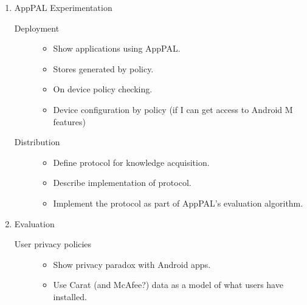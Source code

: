\documentclass[a4paper]{scrartcl}
\begin{document}
\begin{enumerate}
  \item AppPAL Experimentation
    \begin{description}
      \item[Deployment]
        \hfill
        \begin{itemize}
          \item Show applications using AppPAL.
          \item Stores generated by policy.
          \item On device policy checking.
          \item Device configuration by policy (if I can get access to Android M features)
        \end{itemize}
      \item[Distribution]
        \hfill
        \begin{itemize}
          \item Define protocol for knowledge acquisition.
          \item Describe implementation of protocol.
          \item Implement the protocol as part of AppPAL's evaluation algorithm.
        \end{itemize}
    \end{description}
  \item Evaluation
    \begin{description}
      \item[User privacy policies]
        \hfill
        \begin{itemize}
          \item Show privacy paradox with Android apps.
          \item Use Carat (and McAfee?) data as a model of what users have installed.

\end{itemize}
\end{description}
\end{enumerate}
\end{document}

